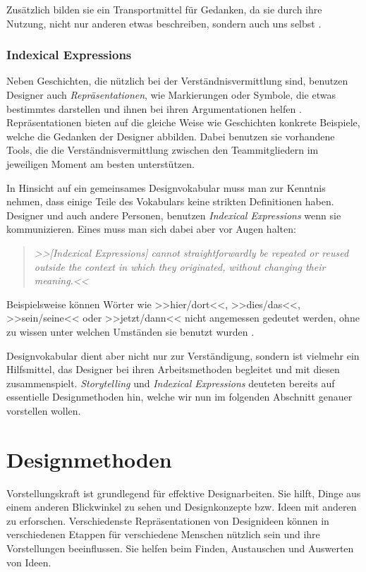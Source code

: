 \medskip Zusätzlich bilden sie ein Transportmittel für Gedanken, da sie durch ihre Nutzung, nicht nur anderen etwas beschreiben, sondern auch uns selbst \citep{Norman:1993}.

\subsubsection{Indexical Expressions}
Neben Geschichten, die nützlich bei der Verständnisvermittlung sind, benutzen Designer auch \emph{Repräsentationen}, wie Markierungen oder Symbole, die etwas bestimmtes darstellen und ihnen bei ihren Argumentationen helfen \citep{Norman:1993}. Repräsentationen bieten auf die gleiche Weise wie Geschichten konkrete Beispiele, welche die Gedanken der Designer abbilden. Dabei benutzen sie vorhandene Tools, die die Verständnisvermittlung zwischen den Teammitgliedern im jeweiligen Moment am besten unterstützen.

\medskip In Hinsicht auf ein gemeinsames Designvokabular muss man zur Kenntnis nehmen, dass einige Teile des Vokabulars keine strikten Definitionen haben. Designer und auch andere Personen, benutzen \emph{Indexical Expressions} wenn sie kommunizieren. Eines muss man sich dabei aber vor Augen halten:

\begin{quote}
	\textsl{>>[Indexical Expressions] cannot straightforwardly be repeated or reused outside the context in which they originated, without changing their meaning.<<}
\begin{flushright}\citep{Kristoffersen:1999}\end{flushright}
\end{quote}

Beispielsweise können Wörter wie >>hier/dort<<, >>dies/das<<, >>sein/seine<< oder >>jetzt/dann<< nicht angemessen gedeutet werden, ohne zu wissen unter welchen Umständen sie benutzt wurden \citep{Larsson:2003}.

\medskip Designvokabular dient aber nicht nur zur Verständigung, sondern ist vielmehr ein Hilfsmittel, das Designer bei ihren Arbeitsmethoden begleitet und mit diesen zusammenspielt. \emph{Storytelling} und \emph{Indexical Expressions} deuteten bereits auf essentielle Designmethoden hin, welche wir nun im folgenden Abschnitt genauer vorstellen wollen.

\section{Designmethoden}
Vorstellungskraft ist grundlegend für effektive Designarbeiten. Sie hilft, Dinge aus einem anderen Blickwinkel zu sehen und Designkonzepte bzw. Ideen mit anderen zu erforschen. Verschiedenste Repräsentationen von Designideen können in verschiedenen Etappen für verschiedene Menschen nützlich sein und ihre Vorstellungen beeinflussen. Sie helfen beim Finden, Austauschen und Auswerten von Ideen.

